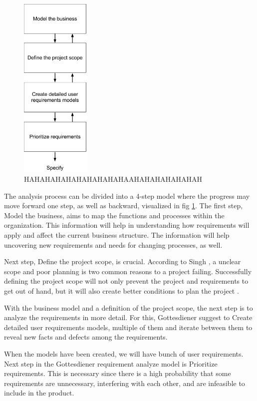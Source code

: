 \documentclass[a4paper]{article}
\begin{document}
\begin{figure}[H]
	\centering
		\includegraphics[width=0.3\textwidth]{images/analysis_model.png}
	\caption{HAHAHAHAHAHAHAHAHAHAAHAHAHAHAHAHAH}
	\label{figure:analysis}
\end{figure}

The analysis process can be divided into a 4-step model where the progress may move forward one step, as well as backward, visualized in fig \ref{figure:analysis}\cite{gott111}. The first step, Model the business, aims to map the functions and processes within the organization. This information will help in understanding how requirements will apply and affect the current business structure. The information will help uncovering new requirements and needs for changing processes, as well.
 
Next step, Define the project scope, is crucial. According to Singh \cite{projectsmart}, a unclear scope and poor planning is two common reasons to a project failing. Successfully defining the project scope will not only prevent the project and requirements to get out of hand, but it will also create better conditions to plan the project \cite{gott127}. 

With the business model and a definition of the project scope, the next step is to analyze the requirements in more detail. For this, Gottesdiener suggest to Create detailed user requirements models, multiple of them and iterate between them to reveal new facts and defects among the requirements.
        
When the models have been created, we will have bunch of user requirements. Next step in the Gottesdiener requirement analyze model is Prioritize requirements. This is necessary since there is a high probability that some requirements are unnecessary, interfering with each other, and are infeasible to include in the product\cite{Lecture 5}.  
\end{document}

